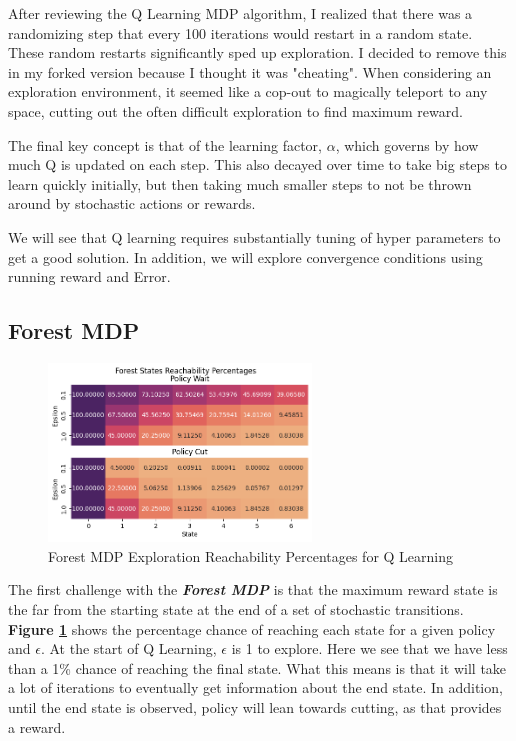 \documentclass[letterpaper]{article} %
\begin{document}
After reviewing the Q Learning MDP algorithm, I realized that there was a randomizing step that every 100 iterations would restart in a random state. These random restarts significantly sped up exploration. I decided to remove this in my forked version because I thought it was "cheating".  When considering an exploration environment, it seemed like a cop-out to magically teleport to any space, cutting out the often difficult exploration to find maximum reward.  

The final key concept is that of the learning factor, \textbf{$\alpha$}, which governs by how much Q is updated on each step. This also decayed over time to take big steps to learn quickly initially, but then taking much smaller steps to not be thrown around by stochastic actions or rewards. 

We will see that Q learning requires substantially tuning of hyper parameters to get a good solution.  In addition, we will explore convergence conditions using running reward and Error.

\subsection{Forest MDP} 

\begin{figure}[!htb]
\centering
\includegraphics[width=2.75in]{Figures/Forest_States_Reachability_Percentages.png}
\caption{Forest MDP Exploration Reachability Percentages for Q Learning}
\label{fig:forest_q_reachability}
\end{figure}
The first challenge with the \textbf{\emph{Forest MDP}} is that the maximum reward state is the far from the starting state at the end of a set of stochastic transitions.   \textbf{Figure \ref{fig:forest_q_reachability}} shows the percentage chance of reaching each state for a given policy and $\epsilon$.  At the start of Q Learning, $\epsilon$ is 1 to explore.  Here we see that we have less than a 1\% chance of reaching the final state.  What this means is that it will take a lot of iterations to eventually get information about the end state.  In addition, until the end state is observed, policy will lean towards cutting, as that provides a reward.  
\end{document}
